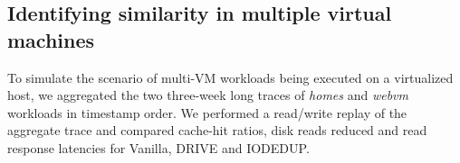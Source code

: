 %
%

\subsection{Identifying similarity in multiple virtual machines}
To simulate the scenario of multi-VM workloads being executed on a
virtualized host, we aggregated the two three-week long traces of
\textit{homes} and \textit{webvm} workloads in timestamp order. We 
performed a read/write replay of the aggregate trace and compared
cache-hit ratios, disk reads reduced and read response latencies for
Vanilla, DRIVE and IODEDUP. 

